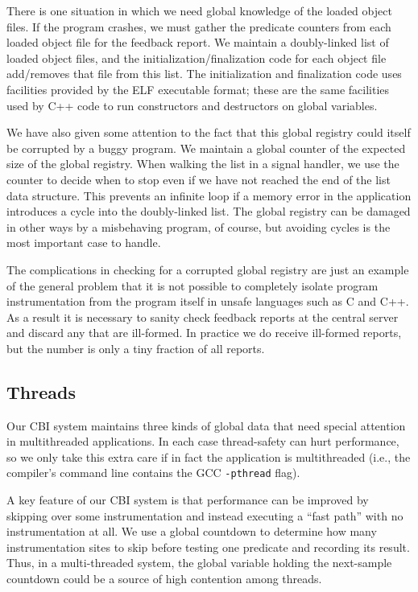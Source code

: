 \documentclass[times,10pt,twocolumn]{article}
\begin{document}
There is one situation in which we need global knowledge of the loaded
object files.  If the program crashes, we must gather
the predicate counters from each loaded object file for the feedback report.
We maintain a doubly-linked list of loaded object files, and the
initialization/finalization code for each object file add/removes that
file from this list. The initialization and finalization code uses
facilities provided by the ELF executable format; these are the same
facilities used by C++ code to run constructors and destructors on
global variables.

We have also given some attention to the fact that this global
registry could itself be corrupted by a buggy program.  We maintain a
global counter of the expected size of the global registry.  When
walking the list in a signal handler, we use the counter to decide
when to stop even if we have not reached the end of the list data
structure.  This prevents an infinite loop if a memory error in the
application introduces a cycle into the doubly-linked list.  The
global registry can be damaged in other ways by a misbehaving program,
of course, but avoiding cycles is the most important case to handle.

The complications in checking for a corrupted global registry are just
an example of the general problem that it is not possible to
completely isolate program instrumentation from the program itself in
unsafe languages such as C and C++.  As a result it is necessary to
sanity check feedback reports at the central server and discard any
that are ill-formed.  In practice we do receive ill-formed reports,
but the number is only a tiny fraction of all reports.

\subsection{Threads}

Our CBI system maintains three kinds of global data that 
need special attention in multithreaded
applications.  In each case thread-safety can hurt performance, 
so we only take this extra care if in fact the application is multithreaded
(i.e., the compiler's command line contains the GCC \texttt{-pthread} flag).

A key feature of our CBI system is that performance can be improved by
skipping over some instrumentation and instead executing a ``fast path''
with no instrumentation at all.  We use a global countdown to determine
how many instrumentation sites to skip before testing one predicate and
recording its result.  Thus, in a multi-threaded system, the global variable
holding the next-sample countdown could be a source of high contention among
threads.
\end{document}
